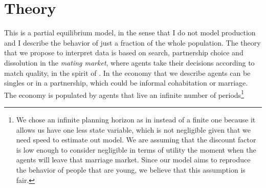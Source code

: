 \documentclass[12pt]{article}
\begin{document}
\section{Theory}
 This is a partial equilibrium model, in the sense that I do not model production and I describe the behavior of just a fraction of the whole population. The theory that we propose to interpret data is based on search, partnership choice and dissolution in the \textit{mating market}, where agents take their decisions according to match quality, in the spirit of \citet{jovanovic1979}. In the economy that we describe agents can be singles or in a partnership, which could be informal cohabitation or marriage. The economy is populated by agents that live an infinite number of periods\footnote{We chose an infinite planning horizon as in \citet{gemici2014} instead of a finite one because it allows us have one less state variable, which is not negligible given that we need speed to estimate out model. We are assuming that the discount factor is low enough to consider negligible in terms of utility the moment when the agents will leave that marriage market. Since our model aims to reproduce the behavior of people that are young, we believe that this assumption is fair.}
\end{document}
